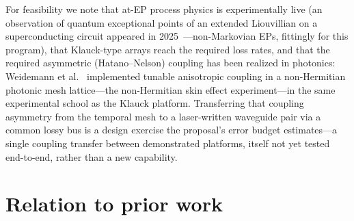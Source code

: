 ﻿\documentclass[11pt]{article}
\theoremstyle{remark}
\begin{document}
For feasibility we note that at-EP process physics is
experimentally live (an observation of quantum exceptional points
of an extended Liouvillian on a superconducting circuit appeared
in 2025~\cite{QubitEP2025}---non-Markovian EPs, fittingly for this
program), that Klauck-type arrays reach the required loss rates,
and that the required asymmetric (Hatano--Nelson) coupling has
been realized in photonics: Weidemann et
al.~\cite{Weidemann2020} implemented tunable anisotropic coupling
in a non-Hermitian photonic mesh lattice---the non-Hermitian skin
effect experiment---in the same experimental school as the Klauck
platform. Transferring that coupling asymmetry from the temporal
mesh to a laser-written waveguide pair via a common lossy bus is a
design exercise the proposal's error budget estimates---a single
coupling transfer between demonstrated platforms, itself not yet tested
end-to-end, rather than a new capability.

\section{Relation to prior work}
\label{sec:prior}
\end{document}
